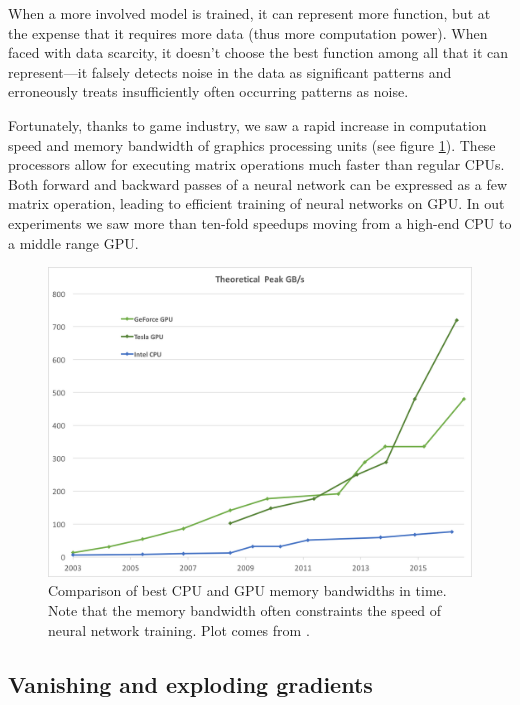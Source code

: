 When a more involved model is trained, it can represent more function, but at the expense that it requires more data (thus more computation power). When faced with data scarcity, it doesn't choose the best function among all that it can represent---it falsely detects noise in the data as significant patterns and erroneously treats insufficiently often occurring patterns as noise.

Fortunately, thanks to game industry, we saw a rapid increase in computation speed and memory bandwidth of graphics processing units (see figure \ref{nvidia-speed}). These processors allow for executing matrix operations much faster than regular CPUs. Both forward and backward passes of a neural network can be expressed as a few matrix operation, leading to efficient training of neural networks on GPU. In out experiments we saw more than ten-fold speedups moving from a high-end CPU to a middle range GPU.

\begin{figure}[h]
  \includegraphics[width=\linewidth]{images/gpu-bandwidth.png}
  \caption{Comparison of best CPU and GPU memory bandwidths in time. Note that the memory bandwidth often constraints the speed of neural network training. Plot comes from \cite{nvidia-docs}.}\label{nvidia-speed}
\end{figure}

\subsection{Vanishing and exploding gradients}

